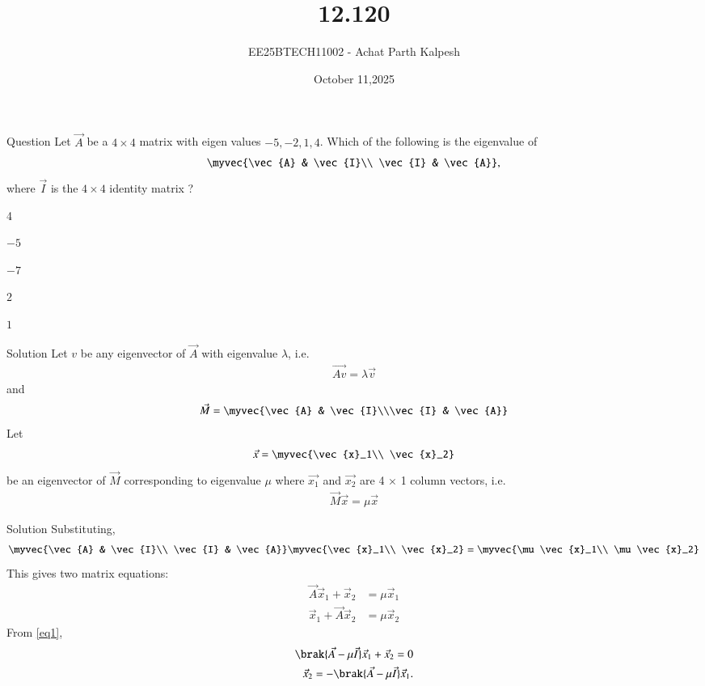 \documentclass{beamer}
\title %
{12.120}
\date{October 11,2025}
\author %
{EE25BTECH11002 - Achat Parth Kalpesh}
\begin{document}
\frame{\titlepage}

\begin{frame}{Question}
Let $\vec{A}$ be a $4 \times 4$ matrix with eigen values $-5,-2,1,4 $. Which of the following is the eigenvalue of
\begin{align}
    \myvec{\vec{A} & \vec{I}\\ \vec{I} & \vec{A}},
\end{align} 
where $\vec{I}$ is the $4 \times 4$ identity matrix ?
\begin{enumerate}
	\begin{multicols}{4}
    \item $-5$
    \item $-7$
    \item $2$
    \item $1$
    \end{multicols}
\end{enumerate}
\end{frame}

\begin{frame}{Solution}
Let $v$ be any eigenvector of $\vec{A}$ with eigenvalue $\lambda$, i.e.
\begin{align}
    \vec{Av}=\lambda \vec{v}
\end{align}
and
\begin{align}
    \vec{M} = \myvec{\vec{A} & \vec{I}\\\vec{I} & \vec{A}}
\end{align}
Let 
\begin{align}
    \vec{x} = \myvec{\vec{x}_1\\ \vec{x}_2}
\end{align}
be an eigenvector of $\vec{M}$ corresponding to eigenvalue $\mu$ where $\vec{x_1}$ and $\vec{x_2}$ are 4 $\times$ 1 column vectors, i.e.
\begin{align}
    \vec{M}\vec{x} = \mu \vec{x}
\end{align}
\end{frame}



\begin{frame}{Solution}
Substituting,
\begin{align}
    \myvec{\vec{A} & \vec{I}\\ \vec{I} & \vec{A}}
    \myvec{\vec{x}_1\\ \vec{x}_2} = \myvec{\mu \vec{x}_1\\ \mu \vec{x}_2}
\end{align}
This gives two matrix equations:
\begin{align}
\vec{A}\vec{x}_1 + \vec{x}_2 &= \mu \vec{x}_1 \label{eq1}\\
\vec{x}_1 + \vec{A}\vec{x}_2 &= \mu \vec{x}_2 \label{eq2}
\end{align}
From \eqref{eq1},
\begin{align}
    \brak{\vec{A} - \mu \vec{I}}\vec{x}_1 + \vec{x}_2 = 0\\
\vec{x}_2 = -\brak{\vec{A} - \mu \vec{I}}\vec{x}_1.
\end{align}
\end{frame}
\end{document}
